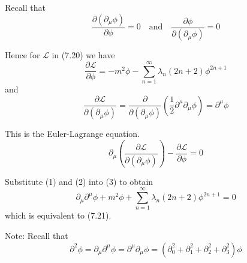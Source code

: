 


\bigskip
Recall that
\begin{equation*}
\frac{\partial(\partial_\mu\phi)}{\partial\phi}=0
\quad\text{and}\quad
\frac{\partial\phi}{\partial(\partial_\mu\phi)}=0
\end{equation*}

Hence for $\mathcal L$ in (7.20) we have
\begin{equation*}
\frac{\partial\mathcal L}{\partial\phi}=-m^2\phi-\sum_{n=1}^\infty\lambda_n(2n+2)\phi^{2n+1}
\tag{1}
\end{equation*}
and
\begin{equation*}
\frac{\partial\mathcal L}{\partial(\partial_\mu\phi)}
=\frac{\partial}{\partial(\partial_\mu\phi)}\left(\frac{1}{2}\partial^\mu\partial_\mu\phi\right)
=\partial^\mu\phi
\tag{2}
\end{equation*}

This is the Euler-Lagrange equation.
\begin{equation*}
\partial_\mu\left(\frac{\partial\mathcal L}{\partial(\partial_\mu\phi)}\right)-\frac{\partial\mathcal L}{\partial\phi}=0
\tag{3}
\end{equation*}

Substitute (1) and (2) into (3) to obtain
\begin{equation*}
\partial_\mu\partial^\mu\phi+m^2\phi+\sum_{n=1}^\infty\lambda_n(2n+2)\phi^{2n+1}=0
\end{equation*}
which is equivalent to (7.21).



\bigskip
Note: Recall that
\begin{equation*}
\partial^2\phi
=\partial_\mu\partial^\mu\phi
=\partial^\mu\partial_\mu\phi
=(\partial_0^2+\partial_1^2+\partial_2^2+\partial_3^2)\phi
\end{equation*}


